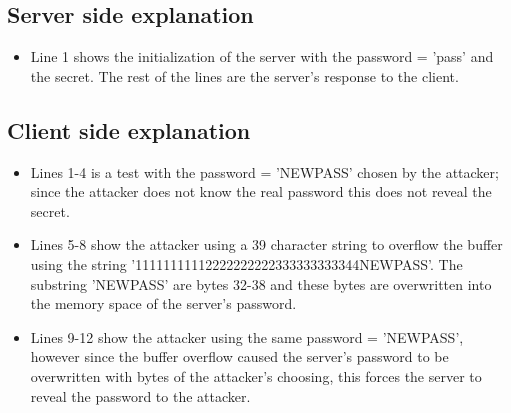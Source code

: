 \documentclass[11pt]{article}
\begin{document}
\subsection*{Server side explanation}
\begin{itemize}
\item Line 1 shows the initialization of the server with the password = 'pass' and the secret. The rest of the lines are the server's response to the client.
\end{itemize}

\subsection*{Client side explanation}
\begin{itemize}
\item Lines 1-4 is a test with the password = 'NEWPASS' chosen by the attacker; since the attacker does not know the real password this does not reveal the secret. 
\item Lines 5-8 show the attacker using a 39 character string to overflow the buffer using the string '11111111112222222222333333333344NEWPASS'. The substring 'NEWPASS' are bytes 32-38 and these bytes are overwritten into the memory space of the server's password.
\item Lines 9-12 show the attacker using the same password = 'NEWPASS', however since the buffer overflow caused the server's password to be overwritten with bytes of the attacker's choosing, this forces the server to reveal the password to the attacker.
\end{itemize}
\end{document}
